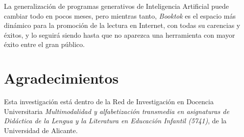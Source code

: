 La generalización de programas generativos de Inteligencia Artificial
puede cambiar todo en pocos meses, pero mientras tanto, \emph{Booktok}
es el espacio más dinámico para la promoción de la lectura en Internet,
con todas su carencias y éxitos, y lo seguirá siendo hasta que no
aparezca una herramienta con mayor éxito entre el gran público.

\section{Agradecimientos}\label{sec-agradecimientos}

Esta investigación está dentro de la Red de Investigación en Docencia
Universitaria \emph{Multimodalidad y alfabetización transmedia en
	asignaturas de Didáctica de la Lengua y la Literatura en Educación
	Infantil (5741)}, de la Universidad de Alicante.
